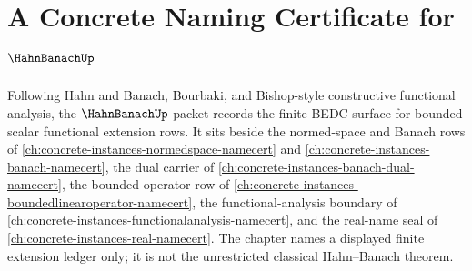\chapter{A Concrete Naming Certificate for $\HahnBanachUp$}
\label{ch:concrete-instances-hahn-banach-namecert}

Following Hahn and Banach, Bourbaki, and Bishop-style constructive functional analysis, the $\HahnBanachUp$ packet records the finite BEDC surface for bounded scalar functional extension rows. It sits beside the normed-space and Banach rows of \autoref{ch:concrete-instances-normedspace-namecert} and \autoref{ch:concrete-instances-banach-namecert}, the dual carrier of \autoref{ch:concrete-instances-banach-dual-namecert}, the bounded-operator row of \autoref{ch:concrete-instances-boundedlinearoperator-namecert}, the functional-analysis boundary of \autoref{ch:concrete-instances-functionalanalysis-namecert}, and the real-name seal of \autoref{ch:concrete-instances-real-namecert}. The chapter names a displayed finite extension ledger only; it is not the unrestricted classical Hahn--Banach theorem.

